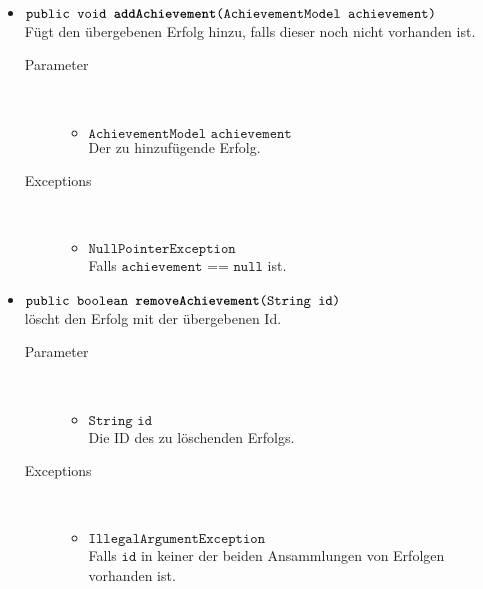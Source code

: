 \begin{description}
\begin{itemize}
		\item $\texttt{public void \textbf{addAchievement}(AchievementModel achievement)}$ \\ Fügt den übergebenen Erfolg hinzu, falls dieser noch nicht vorhanden ist.
		\begin{description}
			\item[Parameter] \hfill \\
			\vspace{-.8cm}
			\begin{itemize}
				\item $\texttt{AchievementModel achievement}$ \\ Der zu hinzufügende Erfolg.
			\end{itemize}
			\item[Exceptions] \hfill \\
			\vspace{-.8cm}
			\begin{itemize}
				\item $\texttt{NullPointerException}$ \\ Falls $\texttt{achievement == null}$ ist.
			\end{itemize}
		\end{description}	

	\item $\texttt{public boolean \textbf{removeAchievement}(String id)}$ \\ löscht den Erfolg mit der übergebenen Id.
		\begin{description}
			\item[Parameter] \hfill \\
			\vspace{-.8cm}
			\begin{itemize}
				\item $\texttt{String id}$ \\ Die ID des zu löschenden Erfolgs.
			\end{itemize}
			\item[Exceptions] \hfill \\
			\vspace{-.8cm}
			\begin{itemize}
				\item $\texttt{IllegalArgumentException}$ \\ Falls $\texttt{id}$ in keiner der beiden Ansammlungen von Erfolgen vorhanden ist.
			\end{itemize}
		\end{description}	

	\end{itemize}
\end{description}